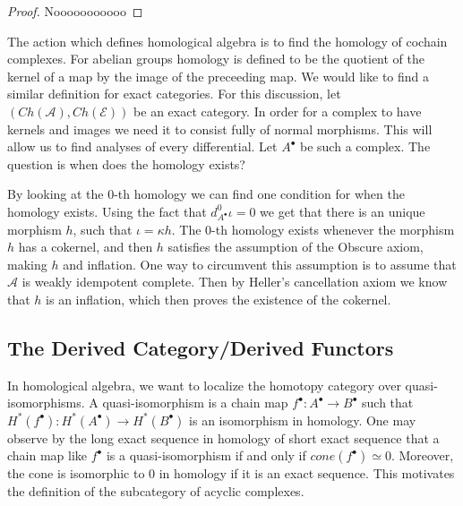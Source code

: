 \documentclass[11pt]{article}
\theoremstyle{definition}
\theoremstyle{remark}
\newcommand{\chain}[1]{#1^{\bullet}}
\begin{document}
            \begin{proof}
                Nooooooooooo
            \end{proof}

            The action which defines homological algebra is to find the homology of cochain complexes. For abelian groups homology is defined to be the quotient of the kernel of a map by the image of the preceeding map. We would like to find a similar definition for exact categories. For this discussion, let $(Ch(\mathcal{A}),Ch(\mathcal{E}))$ be an exact category. In order for a complex to have kernels and images we need it to consist fully of normal morphisms. This will allow us to find analyses of every differential. Let $\chain{A}$ be such a complex. The question is when does the homology exists?

            \begin{center}
            \end{center}

            By looking at the 0-th homology we can find one condition  for when the homology exists. Using the fact that $d^0_{\chain{A}}\iota = 0$ we get that there is an unique morphism $h$, such that $\iota = \kappa h$. The 0-th homology exists whenever the morphism $h$ has a cokernel, and then $h$ satisfies the assumption of the Obscure axiom, making $h$ and inflation. One way to circumvent this assumption is to assume that $\mathcal{A}$ is weakly idempotent complete. Then by Heller's cancellation axiom we know that $h$ is an inflation, which then proves the existence of the cokernel. 

            
            \subsection{The Derived Category/Derived Functors}  
            
            In homological algebra, we want to localize the homotopy category over quasi-isomorphisms. A quasi-isomorphism is a chain map $\chain{f}:\chain{A}\rightarrow\chain{B}$ such that $H^*(\chain{f}):H^*(\chain{A})\rightarrow H^*(\chain{B})$ is an isomorphism in homology. One may observe by the long exact sequence in homology of short exact sequence that a chain map like $\chain{f}$ is a quasi-isomorphism if and only if $cone(\chain{f})\simeq 0$. Moreover, the cone is isomorphic to $0$ in homology if it is an exact sequence. This motivates the definition of the subcategory of acyclic complexes.
\end{document}
